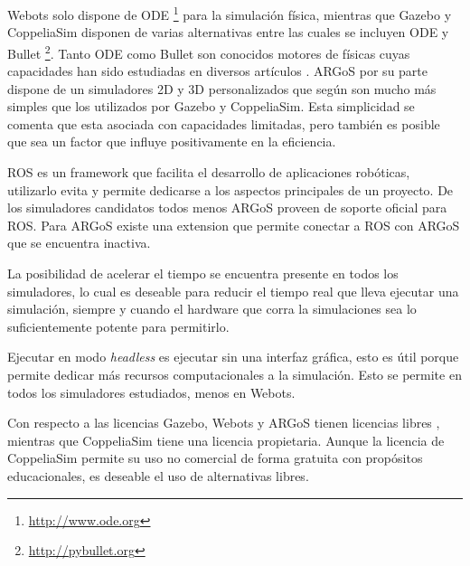 Webots solo dispone de ODE \footnote{\url{http://www.ode.org}} para la simulación física,
mientras que Gazebo y CoppeliaSim disponen de varias alternativas entre las
cuales se incluyen ODE y Bullet \footnote{\url{http://pybullet.org}}. Tanto ODE como Bullet son conocidos
motores de físicas cuyas capacidades han sido estudiadas en diversos artículos
\cite{bzhikhatlov2017research,erez2015simulation,ronnau2013evaluation}.
ARGoS por su parte dispone de un simuladores 2D y 3D personalizados que según
\cite{Pitonakova2018} son mucho más simples que los utilizados por Gazebo y
CoppeliaSim. Esta simplicidad se comenta que esta asociada con capacidades
limitadas, pero también es posible que sea un factor que influye positivamente
en la eficiencia.


ROS \cite{ros} es un framework que facilita el desarrollo de aplicaciones
robóticas, utilizarlo evita  y permite dedicarse
a los aspectos principales de un proyecto. 
De los simuladores candidatos
todos menos ARGoS proveen de soporte oficial para ROS. Para ARGoS existe una
extension \cite{argos_bridge} que permite conectar a ROS con ARGoS que se
encuentra inactiva. %


La posibilidad de acelerar el tiempo se encuentra presente en todos los
simuladores, lo cual es deseable para reducir el tiempo real que lleva ejecutar
una simulación, siempre y cuando el hardware que corra la simulaciones sea lo
suficientemente potente para permitirlo. 

Ejecutar en modo \emph{headless} es ejecutar sin una interfaz gráfica, esto es
útil porque permite dedicar más recursos computacionales a la simulación.
Esto se permite en todos los simuladores estudiados, menos en Webots.

Con respecto a las licencias Gazebo, Webots y ARGoS tienen licencias
libres \cite{fsf}, mientras que CoppeliaSim tiene una licencia propietaria.
Aunque la licencia de CoppeliaSim permite su uso no comercial de forma gratuita
con propósitos educacionales, es deseable el uso de alternativas libres.

